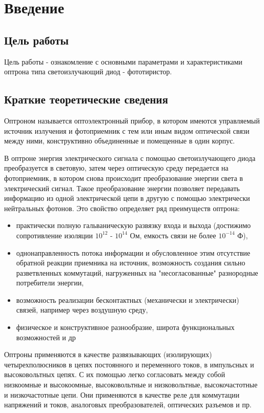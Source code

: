 \section{Введение}

\subsection{Цель работы}

Цель работы - ознакомление с основными параметрами и характеристиками оптрона типа светоизлучающий диод - фототиристор.

\subsection{Краткие теоретические сведения}

Оптроном называется оптоэлектронный прибор, в котором имеются
управляемый источник излучения и фотоприемник с тем или иным видом оптической связи между ними, конструктивно объединенные и помещенные в один корпус.

В оптроне энергия электрического сигнала с помощью светоизлучающего диода преобразуется в световую, затем через оптическую среду передается на фотоприемник, в котором снова происходит преобразование энергии света в электрический сигнал. Такое преобразование энергии позволяет передавать информацию из одной электрической цепи в другую с помощью электрически нейтральных фотонов. Это свойство определяет ряд преимуществ оптрона:
\begin{itemize}
	\item  практически полную гальваническую развязку входа и выхода (достижимо сопротивление изоляции $10^{12}$ - $10^{14}$ Ом, емкость связи не более $10^{-14}$ Ф),
	\item  однонаправленность потока информации и обусловленное этим отсутствие обратной реакции приемника на источник, возможность создания сильно разветвленных коммутаций, нагруженных на "несогласованные" разнородные потребители энергии,
	\item  возможность реализации бесконтактных (механически и электрически) связей, например через воздушную среду,
	\item  физическое и конструктивное разнообразие, широта функциональных возможностей и др
\end{itemize}

Оптроны применяются в качестве развязывающих (изолирующих) четырехполюсников в цепях постоянного и переменного токов, в импульсных и высоковольтных цепях. С их помощью легко согласовать между собой низкоомные и высокоомные, высоковольтные и низковольтные, высокочастотные и низкочастотные цепи. Они применяются в качестве реле для коммутации напряжений и токов, аналоговых преобразователей, оптических разъемов и пр.


